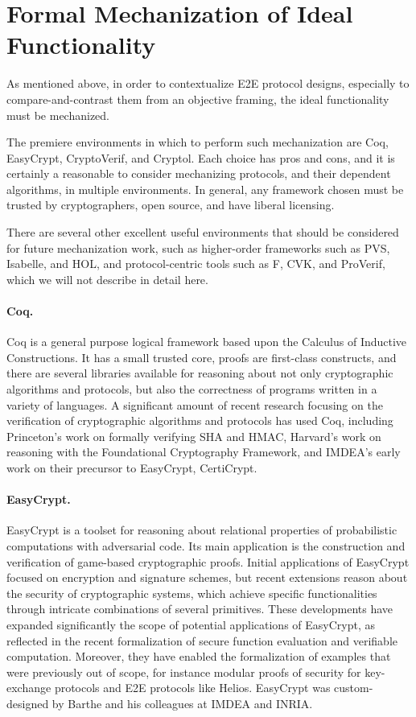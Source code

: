 \section{Formal Mechanization of Ideal Functionality}

As mentioned above, in order to contextualize E2E protocol designs,
especially to compare-and-contrast them from an objective framing, the
ideal functionality must be mechanized.

The premiere environments in which to perform such mechanization are
Coq, EasyCrypt, CryptoVerif, and Cryptol. Each choice has pros and
cons, and it is certainly a reasonable to consider mechanizing
protocols, and their dependent algorithms, in multiple environments.
In general, any framework chosen must be trusted by cryptographers,
open source, and have liberal licensing.

There are several other excellent useful environments that should be
considered for future mechanization work, such as higher-order
frameworks such as PVS, Isabelle, and HOL, and protocol-centric tools
such as F\*, CVK, and ProVerif, which we will not describe in detail
here.

\paragraph{Coq.} Coq is a general purpose logical framework based upon
the Calculus of Inductive Constructions. It has a small trusted core,
proofs are first-class constructs, and there are several libraries
available for reasoning about not only cryptographic algorithms and
protocols, but also the correctness of programs written in a variety
of languages. A significant amount of recent research focusing on the
verification of cryptographic algorithms and protocols has used Coq,
including Princeton's work on formally verifying SHA and HMAC,
Harvard's work on reasoning with the Foundational Cryptography
Framework, and IMDEA's early work on their precursor to EasyCrypt,
CertiCrypt.

\paragraph{EasyCrypt.} EasyCrypt is a toolset for reasoning about
relational properties of probabilistic computations with adversarial
code. Its main application is the construction and verification of
game-based cryptographic proofs. Initial applications of EasyCrypt
focused on encryption and signature schemes, but recent extensions
reason about the security of cryptographic systems, which achieve
specific functionalities through intricate combinations of several
primitives. These developments have expanded significantly the scope
of potential applications of EasyCrypt, as reflected in the recent
formalization of secure function evaluation and verifiable
computation. Moreover, they have enabled the formalization of examples
that were previously out of scope, for instance modular proofs of
security for key-exchange protocols and E2E protocols like
Helios. EasyCrypt was custom-designed by Barthe and his colleagues at
IMDEA and INRIA.

